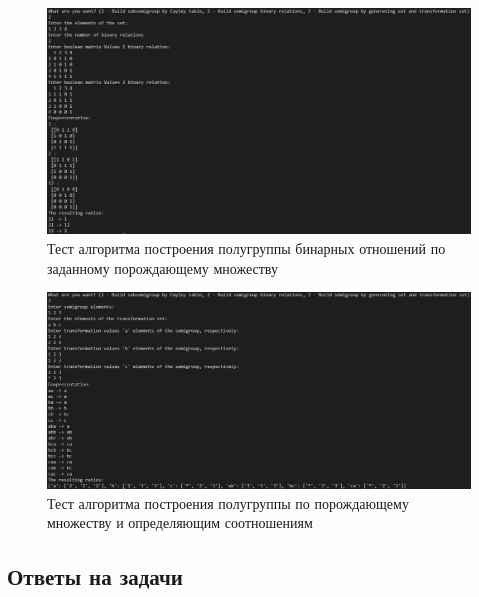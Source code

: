 \documentclass[spec, och, labwork]{shiza}
\begin{document}
        \begin{figure}[H]
            \centering      %
            \includegraphics[width=1.\textwidth]{pic/2}
            \caption{Тест алгоритма построения полугруппы бинарных отношений по
            заданному порождающему множеству}
            \label{fig:image1}
        \end{figure}

        \begin{figure}[H]
            \centering      %
            \includegraphics[width=1.\textwidth]{pic/3}
            \caption{Тест алгоритма построения полугруппы по порождающему
            множеству и определяющим соотношениям}
            \label{fig:image1}
        \end{figure}

        \subsection{Ответы на задачи}

\end{document}
